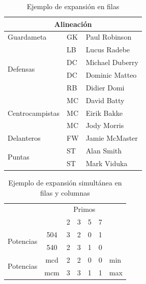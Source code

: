 \documentclass[ 		%
	11pt,				%
	a4paper,			%
	twoside,			%
	openright,			%
	final       		%
]{book}
\begin{document}
\begin{table}[H]%
	\centering
	\caption{Ejemplo de expansión en filas}
	\label{tab:expfilas}
	\begin{tabular}{|l|l|l|} %
	\hline
	\multicolumn{3}{|c|}{Alineación} \\
	\hline
	Guardameta & GK & Paul Robinson \\ \hline
	\multirow{4}{*}{Defensas} & LB & Lucus Radebe \\
	 & DC & Michael Duberry \\
	 & DC & Dominic Matteo \\
	 & RB & Didier Domi \\ \hline
	\multirow{3}{*}{Centrocampistas} & MC & David Batty \\
	 & MC & Eirik Bakke \\
	 & MC & Jody Morris \\ \hline
	Delanteros & FW & Jamie McMaster \\ \hline
	\multirow{2}{*}{Puntas} & ST & Alan Smith \\
	 & ST & Mark Viduka \\
	\hline
	\end{tabular}
\end{table}



\begin{table}[H]%
	\centering
	\caption{Ejemplo de expansión simultánea en filas y columnas}
	\label{tab:expsimul}
	\begin{tabular}{cc|c|c|c|c|l} %
	\cline{3-6}
	& & \multicolumn{4}{|c|}{Primos} \\ \cline{3-6}
	& & 2 & 3 & 5 & 7 \\ \cline{1-6}
	\multicolumn{1}{|c|}{\multirow{2}{*}{Potencias}} &
	\multicolumn{1}{|c|}{504} & 3 & 2 & 0 & 1 &     \\ \cline{2-6}
	\multicolumn{1}{|c|}{}                        &
	\multicolumn{1}{|c|}{540} & 2 & 3 & 1 & 0 &     \\ \cline{1-6}
	\multicolumn{1}{|c|}{\multirow{2}{*}{Potencias}} &
	\multicolumn{1}{|c|}{mcd} & 2 & 2 & 0 & 0 & min \\ \cline{2-6}
	\multicolumn{1}{|c|}{}                        &
	\multicolumn{1}{|c|}{mcm} & 3 & 3 & 1 & 1 & max \\ \cline{1-6}
	\end{tabular}
\end{table}
\end{document}
